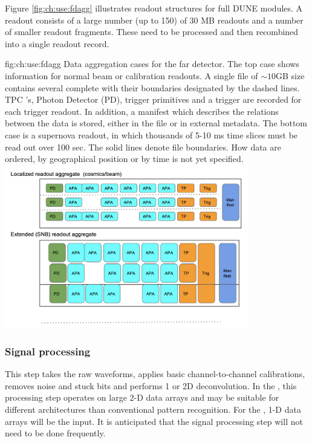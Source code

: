 \documentclass[../main-v1.tex]{subfiles}
\begin{document}
Figure \ref{fig:ch:use:fdagg} illustrates  readout structures for full DUNE  modules.  A readout consists of a large number (up to 150) of   30 MB  readouts and a number of smaller readout fragments.  These need to be processed and then recombined into a single readout record. 

\begin{dunefigure}
{fig:ch:use:fdagg}
{Data aggregation cases for the far detector. The top case shows information for normal beam or calibration readouts. A single file of $\sim 10$GB size contains several complete  with their boundaries designated by the dashed lines.  TPC 's, Photon Detector (PD),  trigger primitives and a trigger  are recorded for each trigger readout.  In addition, a manifest which describes the relations between the data is stored, either in the file or in external metadata.  The bottom case is a supernova readout, in which thousands of 5-10 ms time slices must be read out over 100 sec.  The solid lines denote file boundaries. How data are ordered, by geographical position or by time is not  yet specified.}
\includegraphics[width=0.8\textwidth]{graphics/IntroFigures/DataAggregation.png}
\end{dunefigure}

\subsubsection{Signal processing }

This step takes the raw waveforms, applies  basic channel-to-channel calibrations, removes noise and stuck bits and performs 1 or 2D deconvolution.   In the , this processing step operates on large 2-D data arrays and may be suitable for different architectures than conventional pattern recognition. For the , 1-D data arrays will be the input. It is anticipated that the signal processing step will not need to be done frequently. 
\end{document}
